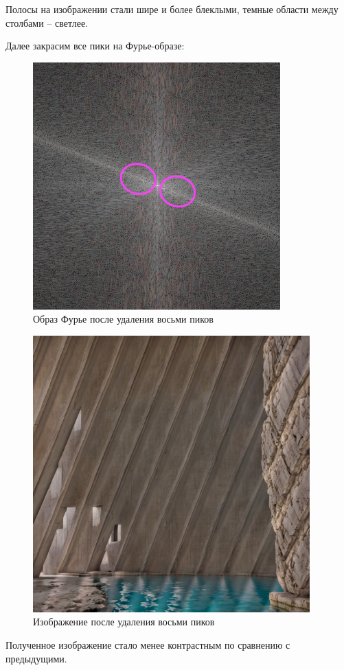 Полосы на изображении стали шире и более блеклыми, темные области между столбами -- светлее. 

Далее закрасим все пики на Фурье-образе:

\begin{figure}[ht!]
    \centering
    \includegraphics[width=\textwidth]{images/result/task_1/Fourier_8_modified_3_peaks.png}
    \caption{Образ Фурье после удаления восьми пиков}
    \label{fig:image_8_m3}
\end{figure}
\clearpage
\begin{figure}[ht!]
    \centering
    \includegraphics[width=0.95\textwidth]{images/result/task_1/result_8_3.png}
    \caption{Изображение после удаления восьми пиков}
    \label{fig:photo_8_m3}
\end{figure}
Полученное изображение стало менее контрастным по сравнению с предыдущими. 

